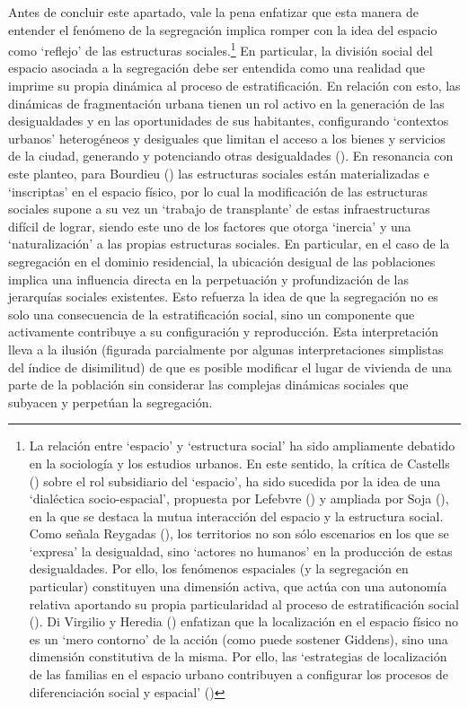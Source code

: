 \documentclass[
  spanish,
  a4paper,%
  chapterprefix=true,%
  DIV=calc,%
  twoside]{scrbook}%
\begin{document}
Antes de concluir este apartado, vale la pena enfatizar que esta manera
de entender el fenómeno de la segregación implica romper con la idea del
espacio como `reflejo' de las estructuras sociales.\footnote{La relación entre `espacio' y `estructura social' ha
  sido ampliamente debatido en la sociología y los estudios urbanos.
  En este sentido, la crítica de Castells () sobre el rol
  subsidiario del `espacio', ha sido sucedida por la idea de una
  `dialéctica socio-espacial', propuesta por Lefebvre () y ampliada
  por Soja (), en la que se destaca la mutua interacción del espacio
  y la estructura social. Como señala Reygadas (), los territorios
  no son sólo escenarios en los que se `expresa' la desigualdad, sino
  `actores no humanos' en la producción de estas desigualdades. Por
  ello, los fenómenos espaciales (y la segregación en particular)
  constituyen una dimensión activa, que actúa con una autonomía
  relativa aportando su propia particularidad al proceso de
  estratificación social (). Di Virgilio y Heredia () enfatizan
  que la localización en el espacio físico no es un `mero contorno' de
  la acción (como puede sostener Giddens), sino una dimensión
  constitutiva de la misma. Por ello, las `estrategias de localización
  de las familias en el espacio urbano contribuyen a configurar los
  procesos de diferenciación social y espacial' ()} En
particular, la división social del espacio asociada a la segregación
debe ser entendida como una realidad que imprime su propia dinámica al
proceso de estratificación. En relación con esto, las dinámicas de
fragmentación urbana tienen un rol activo en la generación de las
desigualdades y en las oportunidades de sus habitantes, configurando
`contextos urbanos' heterogéneos y desiguales que limitan el acceso a
los bienes y servicios de la ciudad, generando y potenciando otras
desigualdades (). En resonancia con este planteo, para
Bourdieu () las estructuras sociales están materializadas e
`inscriptas' en el espacio físico, por lo cual la modificación de las
estructuras sociales supone a su vez un `trabajo de transplante' de
estas infraestructuras difícil de lograr, siendo este uno de los
factores que otorga `inercia' y una `naturalización' a las propias
estructuras sociales. En particular, en el caso de la segregación en el
dominio residencial, la ubicación desigual de las poblaciones implica
una influencia directa en la perpetuación y profundización de las
jerarquías sociales existentes. Esto refuerza la idea de que la
segregación no es solo una consecuencia de la estratificación social,
sino un componente que activamente contribuye a su configuración y
reproducción. Esta interpretación lleva a la ilusión (figurada
parcialmente por algunas interpretaciones simplistas del índice de
disimilitud) de que es posible modificar el lugar de vivienda de una
parte de la población sin considerar las complejas dinámicas sociales
que subyacen y perpetúan la segregación.
\end{document}
